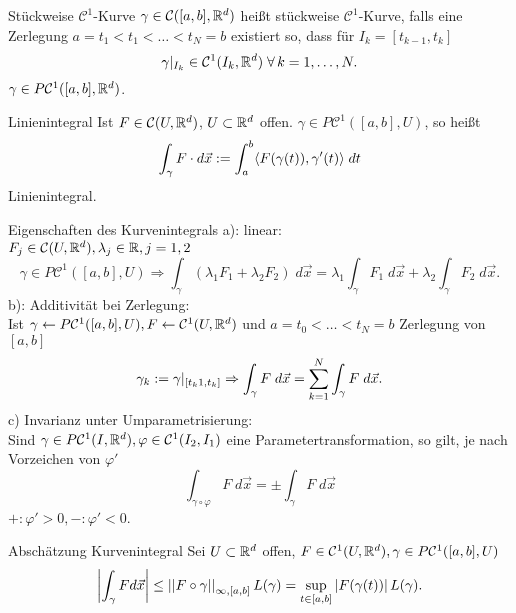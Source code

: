 \documentclass[main.tex]{subfiles}
\begin{document}
\begin{karte}{Stückweise \( \mathcal{C}^1 \)-Kurve}
    \(\gamma \in \mathcal{C}([a,b], \R^d)\) heißt stückweise
    \(\mathcal{C}^1\)-Kurve, falls eine Zerlegung
    \(a = t_1 < t_1 < \ldots < t_N = b\) existiert so, dass
    für \( I_k = [t_{k-1}, t_k]\)
    \[ \gamma \vert_{I_k} \in \mathcal{C}^1(I_k, \R^d) 
    \; \forall k = 1,\ldots,N. \]
    \( \gamma \in P \mathcal{C}^1([a,b], \R^d)\).
\end{karte}

\begin{karte}{Linienintegral}
    Ist \( F \in \mathcal{C}(U, \R^d) \), \(U \subset \R^d\) offen. 
    \( \gamma \in P\mathcal{C}^1([a,b], U) \), so heißt 
    \[ \int_\gamma F\cdot d \vec{x} 
    := \integralx{\scalarprod{ F(\gamma(t)) }{ \gamma'(t) } }{a}{b}{t} \]
    Linienintegral.
\end{karte}

\begin{karte}{Eigenschaften des Kurvenintegrals}
    a): linear: \\
    \( F_j \in \mathcal{C}(U, \R^d), \lambda_j \in \R, j = 1,2 \)
    \[ \gamma \in P\mathcal{C}^1([a,b], U) \Rightarrow 
    \int_\gamma (\lambda_1 F_1 + \lambda_2 F_2)\; d\vec{x} 
    = \lambda_1 \int_\gamma F_1\; d\vec{x} + \lambda_2 \int_\gamma F_2
    \; d\vec{x}. \]
    b): Additivität bei Zerlegung:\\
    Ist \(\gamma \leftarrow P\mathcal{C}^1([a,b], U), 
    F \leftarrow \mathcal{C}^1(U, \R^d) \)
    und \(a = t_0 < \ldots < t_N = b\) Zerlegung von \([a,b]\)
    \[\gamma_k := \gamma\vert_{[t_k1, t_k]}
    \Rightarrow \integralx{F}{\gamma}{}{\vec{x}}
    = \sum_{k=1}^N\integralx{F}{\gamma}{}{\vec{x}}.\]    
    c) Invarianz unter Umparametrisierung:\\
    Sind \(\gamma \in P\mathcal{C}^1(I,\R^d), \varphi \in 
    \mathcal{C}^1(I_2, I_1)\)
    eine Parametertransformation, so gilt, je nach Vorzeichen 
    von \(\varphi'\)
    \[ \int_{\gamma \circ \varphi} F \; d\vec{x} 
    = \pm \int_\gamma F \; d\vec{x} \]
    \(+: \varphi' > 0, -: \varphi' < 0\).
\end{karte}

\begin{karte}{Abschätzung Kurvenintegral}
    Sei \(U \subset \R^d\) offen, \(F \in \mathcal{C}^1(U, \R^d), \gamma \in P\mathcal{C}^1([a,b], U)\)
    \[ \abs{\int_\gamma F d\vec{x}} \leq \norm{F \circ \gamma}_{\infty,[a,b]} L(\gamma) 
    = \underset{t \in [a,b]}{\sup} \abs{F(\gamma(t))} L(\gamma).\]
\end{karte}
\end{document}
